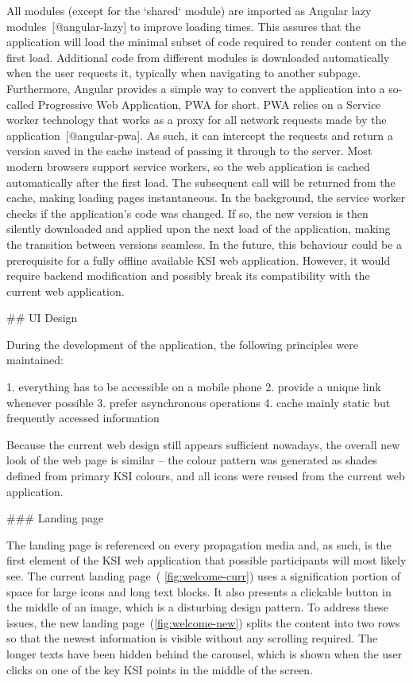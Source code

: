 \documentclass[
  digital, %
  oneside, %
  lof,     %
  nolot,     %
]{fithesis4}
\begin{document}
{All modules (except for the `shared` module) are imported as Angular lazy modules~[@angular-lazy] to improve loading times. This assures that the application will load the minimal subset of code required to render content on the first load. Additional code from different modules is downloaded automatically when the user requests it, typically when navigating to another subpage. Furthermore, Angular provides a simple way to convert the application into a so-called Progressive Web Application, PWA for short. PWA relies on a Service worker technology that works as a proxy for all network requests made by the application~[@angular-pwa]. As such, it can intercept the requests and return a version saved in the cache instead of passing it through to the server. Most modern browsers support service workers, so the web application is cached automatically after the first load. The subsequent call will be returned from the cache, making loading pages instantaneous. In the background, the service worker checks if the application's code was changed. If so, the new version is then silently downloaded and applied upon the next load of the application, making the transition between versions seamless. In the future, this behaviour could be a prerequisite for a fully offline available \acrshort{KSI} web application. However, it would require backend modification and possibly break its compatibility with the current web application.

## UI Design

During the development of the application, the following principles were maintained:

1. everything has to be accessible on a mobile phone
2. provide a unique link whenever possible
3. prefer asynchronous operations
4. cache mainly static but frequently accessed information

Because the current web design still appears sufficient nowadays, the overall new look of the web page is similar -- the colour pattern was generated as shades defined from primary \acrshort{KSI} colours, and all icons were reused from the current web application.

### Landing page

The landing page is referenced on every propagation media and, as such, is the first element of the \acrshort{KSI} web application that possible participants will most likely see. The current landing page~( \autoref{fig:welcome-curr}) uses a signification portion of space for large icons and long text blocks. It also presents a clickable button in the middle of an image, which is a disturbing design pattern. To address these issues, the new landing page~(\autoref{fig:welcome-new}) splits the content into two rows so that the newest information is visible without any scrolling required. The longer texts have been hidden behind the carousel, which is shown when the user clicks on one of the key \acrshort{KSI} points in the middle of the screen.

}
\end{document}
